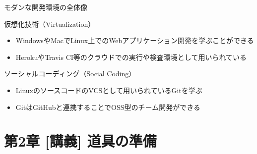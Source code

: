 \documentclass[12pt, t, aspectratio=169]{beamer}
\begin{document}
\begin{frame}[label=sec-1-4-4]{モダンな開発環境の全体像}
\begin{block}{仮想化技術（Virtualization）}
\begin{itemize}
\item WindowsやMacでLinux上でのWebアプリケーション開発を学ぶことができる
\item HerokuやTravis CI等のクラウドでの実行や検査環境として用いられている
\end{itemize}
\end{block}
\begin{block}{ソーシャルコーディング（Social Coding）}
\begin{itemize}
\item LinuxのソースコードのVCSとして用いられているGitを学ぶ
\item GitはGitHubと連携することでOSS型のチーム開発ができる
\end{itemize}
\end{block}
\end{frame}

\part{第2章 [講義] 道具の準備}
\label{sec-2}
\end{document}
